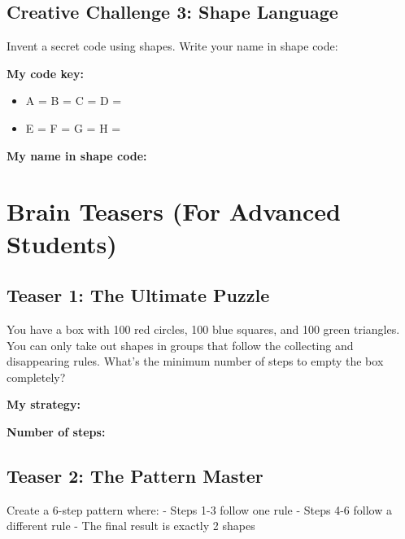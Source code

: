 \documentclass{article}
\begin{document}
\subsection*{Creative Challenge 3: Shape Language}
Invent a secret code using shapes. Write your name in shape code:

\textbf{My code key:}
\begin{itemize}
    \item A = \underline{\hspace{1cm}} \quad B = \underline{\hspace{1cm}} \quad C = \underline{\hspace{1cm}} \quad D = \underline{\hspace{1cm}}
    \item E = \underline{\hspace{1cm}} \quad F = \underline{\hspace{1cm}} \quad G = \underline{\hspace{1cm}} \quad H = \underline{\hspace{1cm}}
\end{itemize}

\textbf{My name in shape code:}

\vspace{2cm}

\section{Brain Teasers (For Advanced Students)}

\subsection*{Teaser 1: The Ultimate Puzzle}
You have a box with 100 red circles, 100 blue squares, and 100 green triangles. You can only take out shapes in groups that follow the collecting and disappearing rules. What's the minimum number of steps to empty the box completely?

\textbf{My strategy:}
\vspace{3cm}

\textbf{Number of steps:} \underline{\hspace{3cm}}

\subsection*{Teaser 2: The Pattern Master}
Create a 6-step pattern where:
- Steps 1-3 follow one rule
- Steps 4-6 follow a different rule
- The final result is exactly 2 shapes
\end{document}
